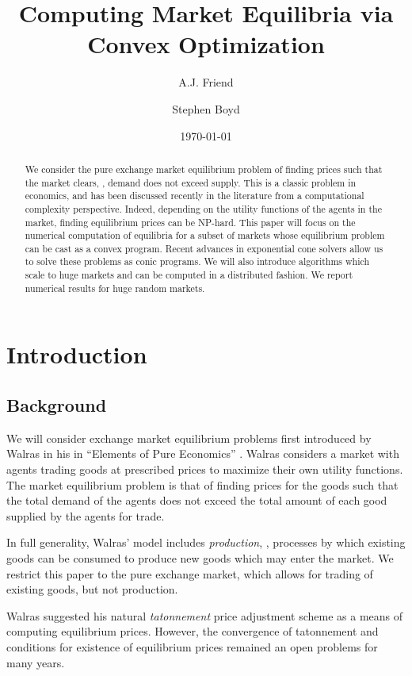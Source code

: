 \documentclass[12pt]{article}
\title{Computing Market Equilibria via Convex Optimization}
\author{A.J. Friend \and Stephen Boyd}
\date{\today}
\begin{document}
\maketitle

\begin{abstract}
We consider the pure exchange market equilibrium problem of finding prices
such that the market clears, \ie, demand does not exceed supply.
This is a classic problem in economics, and has been discussed recently
in the literature from a computational complexity perspective.
Indeed, depending on the utility functions of the agents in the market,
finding equilibrium prices can be NP-hard.
This paper will focus on the numerical computation
of equilibria for a subset of markets whose equilibrium
problem can be cast as a convex program.
Recent advances in exponential cone solvers allow us to solve these problems
as conic programs.
We will also introduce algorithms which scale to huge markets and can be computed
in a distributed fashion.
We report numerical results for huge random markets.
\end{abstract}

\newpage
\tableofcontents
\newpage


\section{Introduction}
\subsection{Background}
We will consider exchange market equilibrium problems first introduced by
Walras in his in ``Elements of Pure Economics''
\cite{walras1896elements}.
Walras considers a market with agents trading
goods at prescribed prices to maximize their own utility functions.
The market equilibrium problem is that of finding prices for the goods
such that the total demand of the agents does not exceed the total amount
of each good supplied by the agents for trade.

In full generality, Walras' model includes \emph{production}, \ie, processes by which existing goods can be consumed to produce new goods which may enter the market.
We restrict this paper to the pure exchange market, which allows for trading of existing goods, but not production.

Walras suggested his natural \emph{tatonnement} price adjustment scheme as a means of computing equilibrium prices.
However, the convergence of tatonnement and conditions for existence of equilibrium prices remained an open problems for many years.
\end{document}
